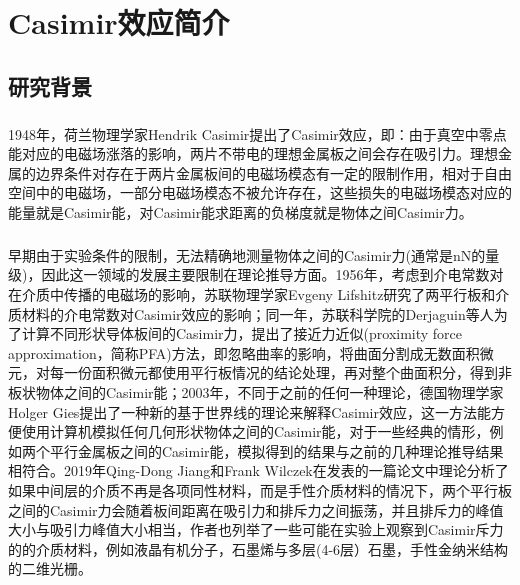 \setlength{\parskip}{-0.9em} 

\chapter{Casimir效应简介}

\section{研究背景}

\paragraph*{}
1948年，荷兰物理学家Hendrik Casimir提出了Casimir效应\cite{Casimir_1948}，即：由于真空中零点能对应的电磁场涨落的影响，两片不带电的理想金属板之间会存在吸引力。理想金属的边界条件对存在于两片金属板间的电磁场模态有一定的限制作用，相对于自由空间中的电磁场，一部分电磁场模态不被允许存在，这些损失的电磁场模态对应的能量就是Casimir能，对Casimir能求距离的负梯度就是物体之间Casimir力。
\paragraph*{}
早期由于实验条件的限制，无法精确地测量物体之间的Casimir力(通常是nN的量级)，因此这一领域的发展主要限制在理论推导方面。1956年，考虑到介电常数对在介质中传播的电磁场的影响，苏联物理学家Evgeny Lifshitz研究了两平行板和介质材料的介电常数对Casimir效应的影响\cite{Lifshitz_1956}；同一年，苏联科学院的Derjaguin等人为了计算不同形状导体板间的Casimir力，提出了接近力近似(proximity force approximation，简称PFA)方法\cite{Derjaguin_1956,Blocki_1977}，即忽略曲率的影响，将曲面分割成无数面积微元，对每一份面积微元都使用平行板情况的结论处理，再对整个曲面积分，得到非板状物体之间的Casimir能；2003年，不同于之前的任何一种理论，德国物理学家Holger Gies提出了一种新的基于世界线的理论来解释Casimir效应\cite{Gies_2003,Gies_2006}，这一方法能方便使用计算机模拟任何几何形状物体之间的Casimir能，对于一些经典的情形，例如两个平行金属板之间的Casimir能，模拟得到的结果与之前的几种理论推导结果相符合。2019年Qing-Dong Jiang和Frank Wilczek在发表的一篇论文中理论分析了如果中间层的介质不再是各项同性材料，而是手性介质材料的情况下，两个平行板之间的Casimir力会随着板间距离在吸引力和排斥力之间振荡，并且排斥力的峰值大小与吸引力峰值大小相当\cite{Qing-DongJiang_2019}，作者也列举了一些可能在实验上观察到Casimir斥力的的介质材料，例如液晶有机分子\cite{Vandendriessche_2013}，石墨烯与多层(4-6层）石墨\cite{Crassee_2011}，手性金纳米结构的二维光栅\cite{Makoto_2005}。
